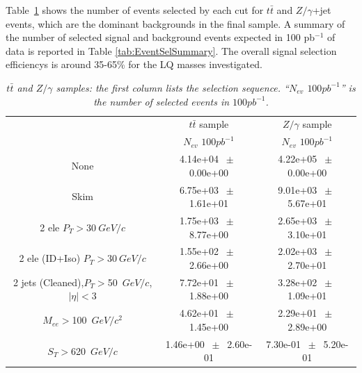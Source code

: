 \documentclass{cmspaper}
\begin{document}
\begin{linenumbers}
 
Table~\ref{tab:selection_effic_ttbar} shows the number of events selected by each cut 
for $t\bar{t}$ and $Z/\gamma$+jet events, which are the dominant backgrounds in the final sample. 
A summary of the number of selected signal and background events expected in 100 pb$^{-1}$ of data 
is reported in Table \ref{tab:EventSelSummary}. 
The overall signal selection efficiencys is around 
35-65\% for the LQ masses investigated. 


\begin{table}[htbp]
\begin{center}
\begin{tabular}{|c| |c|c|}
\hline
\hline
 & $t\bar{t}$ sample  & $Z/\gamma$ sample\\
 & $N_{ev}$ $100pb^{-1}$ & $N_{ev}$ $100pb^{-1}$ \\
  
\hline
\hline
None       &        4.14e+04       $~\pm~$       0.00e+00  &        4.22e+05       $~\pm~$       0.00e+00           \\       
Skim       &        6.75e+03       $~\pm~$       1.61e+01 &        9.01e+03       $~\pm~$       5.67e+01       \\       
2 ele $P_T>30~$$GeV/c$ &        1.75e+03       $~\pm~$       8.77e+00&        2.65e+03       $~\pm~$       3.10e+01     \\       
2 ele (ID+Iso) $P_T>30~$$GeV/c$ &        1.55e+02       $~\pm~$       2.66e+00 &        2.02e+03       $~\pm~$       2.70e+01     \\       
2 jets (Cleaned),$P_T>$50~$GeV/c$,$|\eta|<$3 &        7.72e+01       $~\pm~$       1.88e+00 &        3.28e+02       $~\pm~$       1.09e+01        \\       
$M_{ee}>$100~$GeV/c^2$ &        4.62e+01       $~\pm~$       1.45e+00 &        2.29e+01       $~\pm~$       2.89e+00        \\       
$S_T>$620~$GeV/c$ &        1.46e+00       $~\pm~$       2.60e-01 &        7.30e-01  $~\pm~$       5.20e-01        \\       
\hline
\end{tabular}
\end{center}
\caption{\small \sl $t\bar{t}$ and $Z/\gamma$ samples: the first column lists the selection sequence. ``$N_{ev}$  $100pb^{-1}$'' is the number of selected events in $100pb^{-1}$.}
\label{tab:selection_effic_ttbar}
\end{table}



\end{linenumbers}
\end{document}
